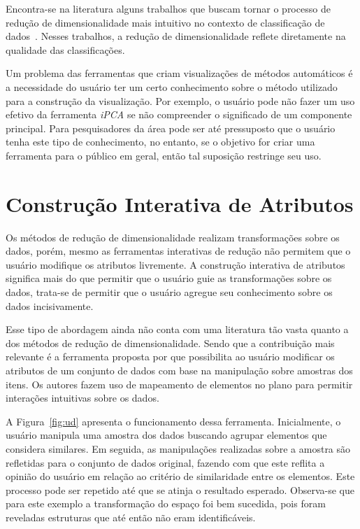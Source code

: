 Encontra-se na literatura alguns trabalhos que buscam tornar o
processo de redução de dimensionalidade mais intuitivo no
contexto de classificação de dados~\citet{Zhang2006,
Choo2010, Paiva2012}. Nesses trabalhos, a redução
de dimensionalidade reflete diretamente na qualidade das
classificações. 

Um problema das ferramentas que criam visualizações de
métodos automáticos é a necessidade do usuário ter um certo
conhecimento sobre o método utilizado para a construção da
visualização. Por exemplo, o usuário pode não fazer um uso
efetivo da ferramenta \emph{iPCA} se não compreender o significado
de  um componente principal.  Para pesquisadores da área
pode ser até pressuposto que o usuário tenha este tipo de
conhecimento, no entanto, se o objetivo for criar uma
ferramenta para o público em geral, então tal suposição 
restringe seu uso.

\section{Construção Interativa de Atributos}\label{sec:tr}

Os métodos de redução de dimensionalidade realizam
transformações sobre os dados, porém, mesmo as ferramentas
interativas de redução não permitem que o usuário modifique
os atributos livremente. A construção interativa de
atributos significa mais do que permitir que o usuário guie
as transformações sobre os dados, trata-se de permitir que o
usuário agregue seu conhecimento sobre os dados
incisivamente.


Esse tipo de abordagem ainda não conta com uma literatura
tão vasta quanto a dos métodos de redução de
dimensionalidade. Sendo que a contribuição mais relevante é a
ferramenta proposta por \citet{Gladys2013} que possibilita ao
usuário modificar os atributos de um conjunto de dados com
base na manipulação sobre amostras dos itens. Os autores
fazem uso de mapeamento de elementos no plano para permitir
interações intuitivas sobre os dados. 

A Figura~\ref{fig:ud} apresenta  o funcionamento dessa
ferramenta. Inicialmente, o usuário manipula uma amostra dos
dados buscando  agrupar elementos que considera similares.
Em seguida, as manipulações realizadas sobre a amostra são
refletidas para o conjunto de dados original, fazendo com
que este reflita a opinião do usuário em relação ao critério
de similaridade entre os elementos. Este processo pode ser
repetido até que se atinja o resultado esperado.  Observa-se
que para este exemplo a transformação do espaço foi bem
sucedida, pois foram reveladas estruturas que até então não
eram identificáveis.


